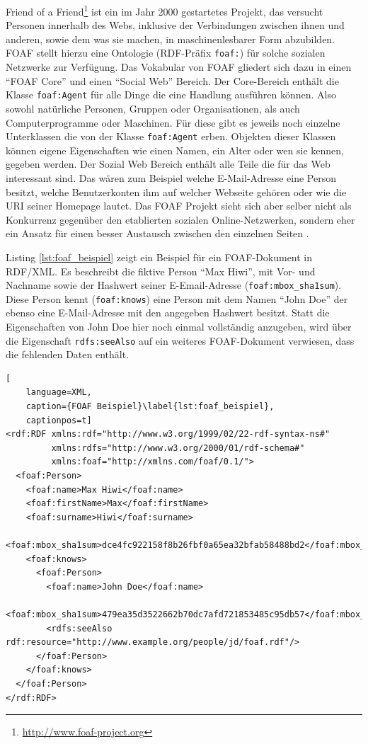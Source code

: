 Friend of a Friend\footnote{\url{http://www.foaf-project.org}} ist ein im Jahr 2000 gestartetes Projekt, das versucht Personen innerhalb des Webs, inklusive der Verbindungen zwischen ihnen und anderen, sowie dem was sie machen, in maschinenlesbarer Form abzubilden. FOAF stellt hierzu eine Ontologie \cite{Brickley2010} (RDF-Präfix \texttt{foaf:}) für solche sozialen Netzwerke zur Verfügung. Das Vokabular von FOAF gliedert sich dazu in einen \enquote{FOAF Core} und einen \enquote{Social Web} Bereich. Der Core-Bereich enthält die Klasse \texttt{foaf:Agent} für alle Dinge die eine Handlung ausführen können. Also sowohl natürliche Personen, Gruppen oder Organisationen, als auch Computerprogramme oder Maschinen. Für diese gibt es jeweils noch einzelne Unterklassen die von der Klasse \texttt{foaf:Agent} erben. Objekten dieser Klassen können eigene Eigenschaften wie einen Namen, ein Alter oder wen sie kennen, gegeben werden. Der Sozial Web Bereich enthält alle Teile die für das Web interessant sind. Das wären zum Beispiel welche E-Mail-Adresse eine Person besitzt, welche Benutzerkonten ihm auf welcher Webseite gehören oder wie die URI seiner Homepage lautet. Das FOAF Projekt sieht sich aber selber nicht als Konkurrenz gegenüber den etablierten sozialen Online-Netzwerken, sondern eher ein Ansatz für einen besser Austausch zwischen den einzelnen Seiten \cite[siehe \enquote{Abstract}]{Brickley2010}.

Listing \ref{lst:foaf_beispiel} zeigt ein Beispiel für ein FOAF-Dokument in RDF/XML. Es beschreibt die fiktive Person \enquote{Max Hiwi}, mit Vor- und Nachname sowie der Hashwert seiner E-Email-Adresse (\texttt{foaf:mbox\_sha1sum}). Diese Person kennt (\texttt{foaf:knows}) eine Person mit dem Namen \enquote{John Doe} der ebenso eine E-Mail-Adresse mit den angegeben Hashwert besitzt. Statt die Eigenschaften von John Doe hier noch einmal vollständig anzugeben, wird über die Eigenschaft \texttt{rdfs:seeAlso} auf ein weiteres FOAF-Dokument verwiesen, dass die fehlenden Daten enthält. 

\begin{lstlisting}[
    language=XML,
    caption={FOAF Beispiel}\label{lst:foaf_beispiel},
    captionpos=t]
<rdf:RDF xmlns:rdf="http://www.w3.org/1999/02/22-rdf-syntax-ns#"
         xmlns:rdfs="http://www.w3.org/2000/01/rdf-schema#"
         xmlns:foaf="http://xmlns.com/foaf/0.1/">
  <foaf:Person>
    <foaf:name>Max Hiwi</foaf:name>
    <foaf:firstName>Max</foaf:firstName>
    <foaf:surname>Hiwi</foaf:surname>
    <foaf:mbox_sha1sum>dce4fc922158f8b26fbf0a65ea32bfab58488bd2</foaf:mbox_sha1sum>
    <foaf:knows>
      <foaf:Person>
        <foaf:name>John Doe</foaf:name>
        <foaf:mbox_sha1sum>479ea35d3522662b70dc7afd721853485c95db57</foaf:mbox_sha1sum>
        <rdfs:seeAlso rdf:resource="http://www.example.org/people/jd/foaf.rdf"/>
      </foaf:Person>
    </foaf:knows>
  </foaf:Person>
</rdf:RDF>
\end{lstlisting}

